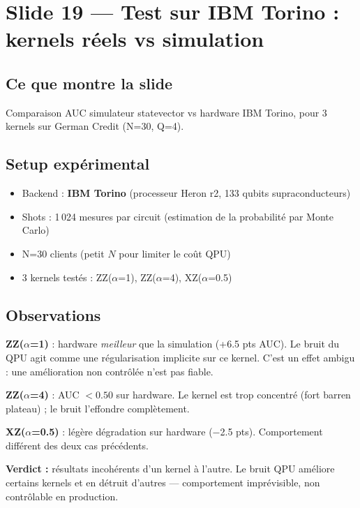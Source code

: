 \documentclass[12pt, a4paper]{article}
\begin{document}
\section{Slide 19 — Test sur IBM Torino : kernels réels vs simulation}

\subsection*{Ce que montre la slide}

Comparaison AUC simulateur statevector vs hardware IBM Torino,
pour 3 kernels sur German Credit (N=30, Q=4).

\subsection*{Setup expérimental}

\begin{itemize}
  \item Backend : \textbf{IBM Torino} (processeur Heron r2, 133 qubits supraconducteurs)
  \item Shots : 1\,024 mesures par circuit (estimation de la probabilité par Monte Carlo)
  \item N=30 clients (petit $N$ pour limiter le coût QPU)
  \item 3 kernels testés : ZZ($\alpha$=1), ZZ($\alpha$=4), XZ($\alpha$=0.5)
\end{itemize}

\subsection*{Observations}

\textbf{ZZ($\alpha$=1)} : hardware \emph{meilleur} que la simulation (+6.5 pts AUC).
Le bruit du QPU agit comme une régularisation implicite sur ce kernel.
C'est un effet ambigu : une amélioration non contrôlée n'est pas fiable.

\textbf{ZZ($\alpha$=4)} : AUC $< 0.50$ sur hardware. Le kernel est trop concentré
(fort barren plateau) ; le bruit l'effondre complètement.

\textbf{XZ($\alpha$=0.5)} : légère dégradation sur hardware ($-$2.5 pts).
Comportement différent des deux cas précédents.

\begin{attention}
\textbf{Verdict :} résultats incohérents d'un kernel à l'autre.
Le bruit QPU améliore certains kernels et en détruit d'autres —
comportement imprévisible, non contrôlable en production.
\end{attention}
\end{document}
